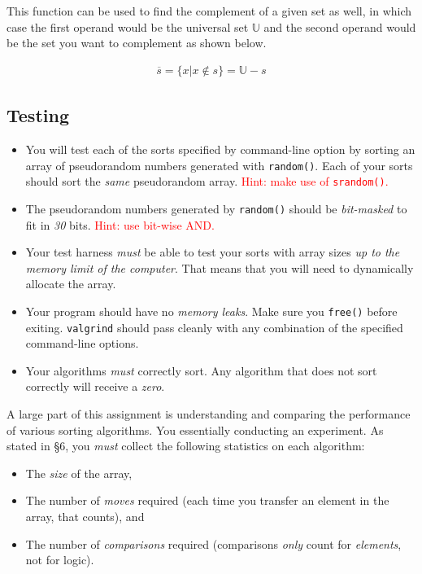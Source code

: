 \documentclass[11pt]{article}
\begin{document}
This function can be used to find the complement of a given set as well,
in which case the first operand would be the universal set $\mathbb{U}$
and the second operand would be the set you want to complement as shown
below.

\begin{align*}
  \overline{s} = \{ x | x \notin s\} = \mathbb{U} -s
\end{align*}

\subsection{Testing}

\begin{itemize}
  \item You will test each of the sorts specified by command-line option
    by sorting an array of pseudorandom numbers generated with
    \texttt{random()}. Each of your sorts should sort the \emph{same}
    pseudorandom array. \textcolor{red}{Hint: make use of
    \texttt{srandom()}.}
  \item The pseudorandom numbers generated by \texttt{random()} should
    be \emph{bit-masked} to fit in \emph{30} bits. \textcolor{red}{Hint: use
    bit-wise AND.}
  \item Your test harness \emph{must} be able to test your sorts with
    array sizes \emph{up to the memory limit of the computer}. That
    means that you will need to dynamically allocate the array.
  \item Your program should have no \emph{memory leaks}. Make sure you
    \texttt{free()} before exiting. \texttt{valgrind} should pass
    cleanly with any combination of the specified command-line options.
  \item Your algorithms \emph{must} correctly sort. Any algorithm that
    does not sort correctly will receive a \emph{zero}.
\end{itemize}

A large part of this assignment is understanding and comparing the
performance of various sorting algorithms. You essentially conducting an
experiment. As stated in \S 6, you \emph{must} collect the following
statistics on each algorithm:

\begin{itemize}
  \item The \emph{size} of the array,
  \item The number of \emph{moves} required (each time you transfer an
    element in the array, that counts), and
  \item The number of \emph{comparisons} required (comparisons
    \emph{only} count for \emph{elements}, not for logic).
\end{itemize}
\end{document}
